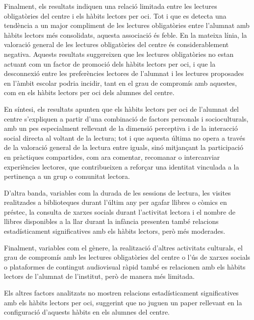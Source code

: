 \documentclass[12pt]{article}
\newif\ifstartwithtitle
\begin{document}
Finalment, els resultats indiquen una relació limitada entre les lectures obligatòries del centre i els hàbits lectors per oci. Tot i que es detecta una tendència a un major compliment de les lectures obligatòries entre l’alumnat amb hàbits lectors més consolidats, aquesta associació és feble. En la mateixa línia, la valoració general de les lectures obligatòries del centre és considerablement negativa. Aquests resultats suggereixen que les lectures obligatòries no estan actuant com un factor de promoció dels hàbits lectors per oci, i que la desconnexió entre les preferències lectores de l’alumnat i les lectures proposades en l’àmbit escolar podria incidir, tant en el grau de compromís amb aquestes, com en els hàbits lectors per oci dels alumnes del centre.

En síntesi, els resultats apunten que els hàbits lectors per oci de l’alumnat del centre s’expliquen a partir d’una combinació de factors personals i socioculturals, amb un pes especialment rellevant de la dimensió perceptiva i de la interacció social directa al voltant de la lectura; tot i que aquesta última no opera a través de la valoració general de la lectura entre iguals, sinó mitjançant la participació en pràctiques compartides, com ara comentar, recomanar o intercanviar experiències lectores, que contribueixen a reforçar una identitat vinculada a la pertinença a un grup o comunitat lectora.

D'altra banda, variables com la durada de les sessions de lectura, les visites realitzades a biblioteques durant l'últim any per agafar llibres o còmics en préstec, la consulta de xarxes socials durant l'activitat lectora i el nombre de llibres disponibles a la llar durant la infància presenten també relacions estadísticament significatives amb els hàbits lectors, però més moderades.

Finalment, variables com el gènere, la realització d'altres activitats culturals, el grau de compromís amb les lectures obligatòries del centre o l'ús de xarxes socials o plataformes de contingut audiovisual ràpid també es relacionen amb els hàbits lectors de l'alumnat de l'institut, però de manera més limitada.

Els altres factors analitzats no mostren relacions estadísticament significatives amb els hàbits lectors per oci, suggerint que no juguen un paper rellevant en la configuració d'aquests hàbits en els alumnes del centre.

\ifstartwithtitle
  \newpage
\fi
\printbibliography
\end{document}
